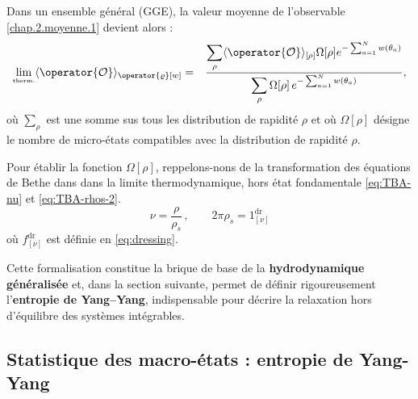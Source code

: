 \medskip
Dans un ensemble général (GGE), la valeur moyenne de l’observable \eqref{chap.2.moyenne.1} devient alors :		
\begin{eqnarray}\label{chap.2.moyenne.2}
	\underset{\mbox{\tiny therm.}}{\lim} \langle \operator{\mathcal{O}} \rangle_{\operator{\varrho}[w]} & =  & \frac{  \displaystyle \sum_{\rho }  \langle \operator{\mathcal{O}}\rangle_{[\rho]} \Omega[\rho] e^{- \sum_{a = 1}^N  w(\theta_a)    }}{ \displaystyle \sum_{\rho}   \Omega[\rho]\,e^{- \sum_{a = 1}^N  w(\theta_a) } } ,
\end{eqnarray}
où $\sum_{\rho }$ est une somme sus tous les distribution de rapidité $\rho$ et 
où $\Omega[\rho]$ désigne le nombre de micro-états compatibles avec la distribution de rapidité $\rho$.


\medskip
Pour établir la fonction $\Omega[\rho]$, reppelons-nons de la transformation des équations de Bethe dans dans la limite thermodynamique, hors état fondamentale \eqref{eq:TBA-nu} et \eqref{eq:TBA-rhos-2}.
\begin{equation}
	\nu = \frac{\rho}{\rho_s} \, , \qquad 2\pi \rho_s = 1^{\mathrm{dr}}_{[\nu]} 
\label{chap.2:eq:TBA-rhos}
\end{equation}
où $f^{\mathrm{dr}}_{[\nu]}$ est définie en \eqref{eq:dressing}.

\medskip

Cette formalisation constitue la brique de base de la \textbf{hydrodynamique généralisée} et, dans la section suivante, permet de définir rigoureusement l’\textbf{entropie de Yang–Yang}, indispensable pour décrire la relaxation hors d’équilibre des systèmes intégrables.


%



\subsection{Statistique des macro-états : entropie de Yang-Yang}

